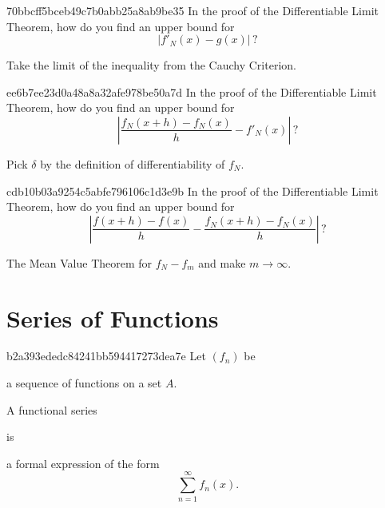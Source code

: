 \begin{note}{70bbcff5bceb49c7b0abb25a8ab9be35}
    In the proof of the Differentiable Limit Theorem, how do you find an upper bound for
    \[
        \left\lvert f'_N(x) - g(x) \right\rvert\,?
    \]

    \begin{cloze}{1}
        Take the limit of the inequality from the Cauchy Criterion.
    \end{cloze}
\end{note}

\begin{note}{ee6b7ee23d0a48a8a32afe978be50a7d}
    In the proof of the Differentiable Limit Theorem, how do you find an upper bound for
    \[
        \left\lvert \frac{f_N(x + h) - f_N(x)}{h} - f'_N(x) \right\rvert\,?
    \]

    \begin{cloze}{1}
        Pick \({ \delta }\) by the definition of differentiability of \({ f_N }\).
    \end{cloze}
\end{note}

\begin{note}{cdb10b03a9254c5abfe796106c1d3e9b}
    In the proof of the Differentiable Limit Theorem, how do you find an upper bound for
    \[
        \left\lvert \frac{f(x + h) - f(x)}{h} - \frac{f_{N}(x + h) - f_N(x)}{h} \right\rvert\,?
    \]

    \begin{cloze}{1}
        The Mean Value Theorem for \({ f_N - f_m }\) and make \({ m \to \infty }\).
    \end{cloze}
\end{note}

\section{Series of Functions} %
\begin{note}{b2a393ededc84241bb594417273dea7e}
    Let \({ (f_n) }\) be \begin{icloze}{3}a sequence of functions on a set \({ A }\).\end{icloze}
    \begin{icloze}{2}A functional series\end{icloze} is
    \begin{icloze}{1}
        a formal expression of the form
        \[
            \sum_{n=1}^{\infty} f_n(x).
        \]
    \end{icloze}
\end{note}

